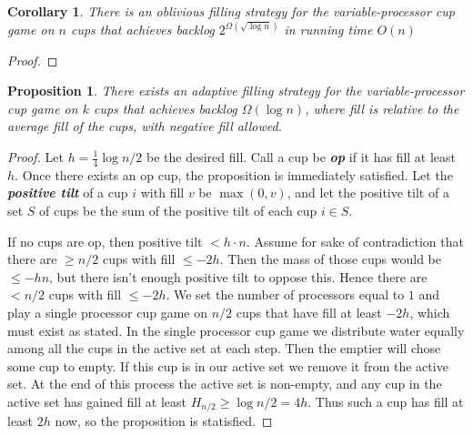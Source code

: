 \documentclass[twocolumn]{article}[11pt]
\newcommand{\defn}[1]{{\textit{\textbf{\boldmath #1}}}}
\renewcommand{\paragraph}[1]{\vspace{0.09in}\noindent{\bf \boldmath #1.}}
\newtheorem{proposition}{Proposition}
\newtheorem{corollary}{Corollary}
\begin{document}
\begin{corollary}
  There is an oblivious filling strategy for the variable-processor cup game on
  $n$ cups that achieves backlog $2^{\Omega(\sqrt{\log n})}$ in running time
  $O(n)$
\end{corollary}
\begin{proof}
  
\end{proof}

\clearpage
\paragraph{Adaptive Lowerbound}
\begin{proposition}
  There exists an adaptive filling strategy for the variable-processor cup game
  on $k$ cups that achieves backlog $\Omega(\log n)$, where fill is relative to
  the average fill of the cups, with negative fill allowed.
\end{proposition}
\begin{proof}
  Let $h = \frac{1}{4}\log n/2$ be the desired fill. Call a cup be \defn{op} if
  it has fill at least $h$. Once there exists an op cup, the proposition is
  immediately satisfied. Let the \defn{positive tilt} of a cup $i$ with fill
  $v$ be $\max(0,v)$, and let the positive tilt of a set $S$ of cups be the sum
  of the positive tilt of each cup $i\in S$.

  If no cups are op, then positive tilt $< h\cdot n$. Assume for sake of
  contradiction that there are $\ge n/2$ cups with fill $\le -2h$. Then the
  mass of those cups would be $\le -hn $, but there isn't enough positive tilt
  to oppose this. Hence there are $<n/2$ cups with fill $\le -2h$. We set the
  number of processors equal to $1$ and play a single processor cup game on
  $n/2$ cups that have fill at least $-2h$, which must exist as stated. In the
  single processor cup game we distribute water equally among all the cups in
  the active set at each step. Then the emptier will chose some cup to empty.
  If this cup is in our active set we remove it from the active set.
  At the end of this process the active set is non-empty, and any cup in the
  active set has gained fill at least $H_{n/2} \ge \log n/2 = 4h$. Thus such a cup
  has fill at least $2h$ now, so the proposition is statisfied.
\end{proof}
\end{document}
